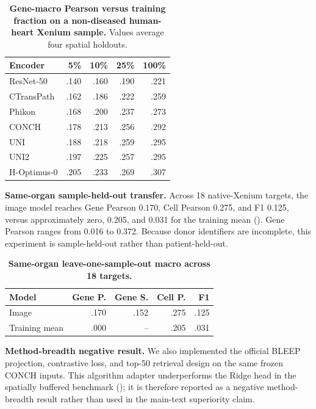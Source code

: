 \documentclass[sigconf,review]{acmart}
\begin{document}
\begin{table}[H]
\centering
\small
\setlength{\tabcolsep}{4pt}
\caption{\textbf{Gene-macro Pearson versus training fraction on a
non-diseased human-heart Xenium sample.} Values average four spatial
holdouts.}
\label{tab:appendix_encoder_training_size}
\begin{tabular}{lrrrr}
\toprule
Encoder & 5\% & 10\% & 25\% & 100\% \\
\midrule
ResNet-50 & .140 & .160 & .190 & .221 \\
CTransPath & .162 & .186 & .222 & .259 \\
Phikon & .168 & .200 & .237 & .273 \\
CONCH & .178 & .213 & .256 & .292 \\
UNI & .188 & .218 & .259 & .295 \\
UNI2 & .197 & .225 & .257 & .295 \\
H-Optimus-0 & .205 & .233 & .269 & .307 \\
\bottomrule
\end{tabular}
\end{table}

\noindent\textbf{Same-organ sample-held-out transfer.}
Across 18 native-Xenium targets, the image model reaches Gene Pearson 0.170,
Cell Pearson 0.275, and F1 0.125, versus approximately zero, 0.205, and 0.031
for the training mean (). Gene Pearson
ranges from 0.016 to 0.372. Because donor identifiers are incomplete, this
experiment is sample-held-out rather than patient-held-out.

\begin{table}[H]
\centering
\small
\caption{\textbf{Same-organ leave-one-sample-out macro across 18 targets.}}
\label{tab:appendix_sample_transfer}
\begin{tabular}{lrrrr}
\toprule
Model & Gene P. & Gene S. & Cell P. & F1 \\
\midrule
Image & .170 & .152 & .275 & .125 \\
Training mean & .000 & -- & .205 & .031 \\
\bottomrule
\end{tabular}
\end{table}

\noindent\textbf{Method-breadth negative result.}
We also implemented the official BLEEP projection, contrastive loss, and
top-50 retrieval design on the same frozen CONCH inputs. This algorithm adapter
underperforms the Ridge head in the spatially buffered benchmark
(); it is therefore reported as a negative
method-breadth result rather than used in the main-text superiority claim.
\end{document}
